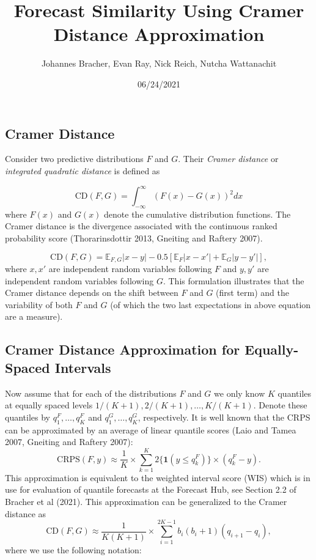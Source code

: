 \documentclass[
]{article}
\title{Forecast Similarity Using Cramer Distance Approximation}
\author{Johannes Bracher, Evan Ray, Nick Reich, Nutcha Wattanachit}
\date{06/24/2021}
\begin{document}
\maketitle

\hypertarget{cramer-distance}{%
\subsection{Cramer Distance}\label{cramer-distance}}

Consider two predictive distributions \(F\) and \(G\). Their
\emph{Cramer distance} or \emph{integrated quadratic distance} is
defined as

\[
\text{CD}(F, G) = \int_{-\infty}^\infty(F(x) - G(x))^2 dx
\] where \(F(x)\) and \(G(x)\) denote the cumulative distribution
functions. The Cramer distance is the divergence associated with the
continuous ranked probability score (Thorarinsdottir 2013, Gneiting and
Raftery 2007).

\begin{equation}
\text{CD}(F, G) = \mathbb{E}_{F, G}|x - y| - 0.5 \left[\mathbb{E}_F|x - x'| + \mathbb{E}_G|y - y'| \right], \label{eq:formulation_expectations}
\end{equation} where \(x, x'\) are independent random variables
following \(F\) and \(y, y'\) are independent random variables following
\(G\). This formulation illustrates that the Cramer distance depends on
the shift between \(F\) and \(G\) (first term) and the variability of
both \(F\) and \(G\) (of which the two last expectations in above
equation are a measure).

\hypertarget{cramer-distance-approximation-for-equally-spaced-intervals}{%
\subsection{Cramer Distance Approximation for Equally-Spaced
Intervals}\label{cramer-distance-approximation-for-equally-spaced-intervals}}

Now assume that for each of the distributions \(F\) and \(G\) we only
know \(K\) quantiles at equally spaced levels
\(1/(K + 1), 2/(K + 1), \dots, K/(K + 1)\). Denote these quantiles by
\(q^F_1, \dots, q^F_K\) and \(q^G_1, \dots, q^G_K\), respectively. It is
well known that the CRPS can be approximated by an average of linear
quantile scores (Laio and Tamea 2007, Gneiting and Raftery 2007):
\begin{equation}
\text{CRPS}(F, y) \approx \frac{1}{K} \times \sum_{k = 1}^K 2\{\mathbf{1}(y \leq q^F_k)\} \times (q^F_k - y).\label{eq:linear_quantile_scores}
\end{equation} This approximation is equivalent to the weighted interval
score (WIS) which is in use for evaluation of quantile forecasts at the
Forecast Hub, see Section 2.2 of Bracher et al (2021). This
approximation can be generalized to the Cramer distance as
\begin{equation}
\text{CD}(F, G) \approx \frac{1}{K(K + 1)} \times \sum_{i = 1}^{2K - 1} b_i(b_i + 1)(q_{i + 1} - q_i),\label{eq:approx1}
\end{equation} where we use the following notation:
\end{document}
